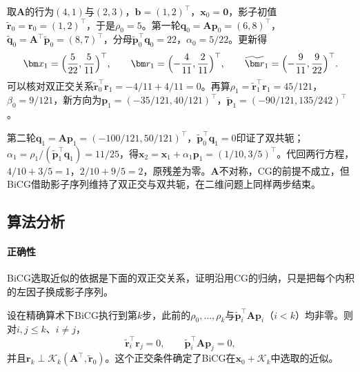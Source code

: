 \begin{example}[非对称二阶系统上的BiCG]
\label{ex:ls-bicg-two-steps}
取$\bm A$的行为$(4,1)$与$(2,3)$，$\bm b=(1,2)^\top$，$\bm x_0=\bm0$，影子初值$\widetilde{\bm r}_0=\bm r_0=(1,2)^\top$，于是$\rho_0=5$。第一轮$\bm q_0=\bm A\bm p_0=(6,8)^\top$，$\widetilde{\bm q}_0=\bm A^\top\widetilde{\bm p}_0=(8,7)^\top$，分母$\widetilde{\bm p}_0^\top\bm q_0=22$，$\alpha_0=5/22$。更新得
\[
 \bm x_1=\Bigl(\frac5{22},\frac5{11}\Bigr)^\top,\qquad
 \bm r_1=\Bigl(-\frac4{11},\frac2{11}\Bigr)^\top,\qquad
 \widetilde{\bm r}_1=\Bigl(-\frac9{11},\frac9{22}\Bigr)^\top .
\]
可以核对双正交关系$\widetilde{\bm r}_0^\top\bm r_1=-4/11+4/11=0$。再算$\rho_1=\widetilde{\bm r}_1^\top\bm r_1=45/121$，$\beta_0=9/121$，新方向为$\bm p_1=(-35/121,40/121)^\top$，$\widetilde{\bm p}_1=(-90/121,135/242)^\top$。

第二轮$\bm q_1=\bm A\bm p_1=(-100/121,50/121)^\top$，$\widetilde{\bm p}_0^\top\bm q_1=0$印证了双共轭；$\alpha_1=\rho_1/(\widetilde{\bm p}_1^\top\bm q_1)=11/25$，得$\bm x_2=\bm x_1+\alpha_1\bm p_1=(1/10,3/5)^\top$。代回两行方程，$4/10+3/5=1$，$2/10+9/5=2$，原残差为零。$\bm A$不对称，CG的前提不成立，但BiCG借助影子序列维持了双正交与双共轭，在二维问题上同样两步结束。
\end{example}

\subsection{算法分析}

\paragraph{正确性}
BiCG选取近似的依据是下面的双正交关系，证明沿用CG的归纳，只是把每个内积的左因子换成影子序列。

\begin{theorem}[BiCG的双正交性]
\label{thm:ls-bicg-biorthogonality}
设在精确算术下BiCG执行到第$k$步，此前的$\rho_0,\ldots,\rho_k$与$\widetilde{\bm p}_i^\top\bm A\bm p_i$（$i<k$）均非零。则对$i,j\le k$、$i\ne j$，
\[
 \widetilde{\bm r}_i^\top\bm r_j=0,\qquad \widetilde{\bm p}_i^\top\bm A\bm p_j=0,
\]
并且$\bm r_k\perp\mathcal K_k(\bm A^\top,\widetilde{\bm r}_0)$。这个正交条件确定了BiCG在$\bm x_0+\mathcal K_k$中选取的近似。
\end{theorem}

